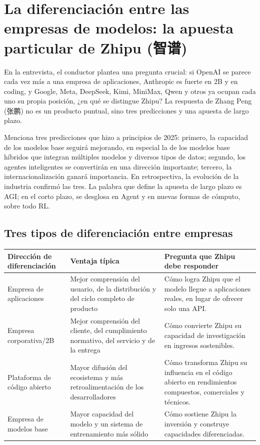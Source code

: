 \section{La diferenciación entre las empresas de modelos: la apuesta particular de Zhipu (智谱)}

En la entrevista, el conductor plantea una pregunta crucial: si OpenAI se parece cada vez más a una empresa de aplicaciones, Anthropic es fuerte en 2B y en coding, y Google, Meta, DeepSeek, Kimi, MiniMax, Qwen y otros ya ocupan cada uno su propia posición, ¿en qué se distingue Zhipu? La respuesta de Zhang Peng (张鹏) no es un producto puntual, sino tres predicciones y una apuesta de largo plazo.

Menciona tres predicciones que hizo a principios de 2025: primero, la capacidad de los modelos base seguirá mejorando, en especial la de los modelos base híbridos que integran múltiples modelos y diversos tipos de datos; segundo, los agentes inteligentes se convertirán en una dirección importante; tercero, la internacionalización ganará importancia. En retrospectiva, la evolución de la industria confirmó las tres. La palabra que define la apuesta de largo plazo es AGI; en el corto plazo, se desglosa en Agent y en nuevas formas de cómputo, sobre todo RL.

\subsection{Tres tipos de diferenciación entre empresas}

\begin{longtable}{p{}p{}p{}}
\toprule
Dirección de diferenciación & Ventaja típica & Pregunta que Zhipu debe responder \\
\midrule
Empresa de aplicaciones & Mejor comprensión del usuario, de la distribución y del ciclo completo de producto & Cómo logra Zhipu que el modelo llegue a aplicaciones reales, en lugar de ofrecer solo una API. \\
Empresa corporativa/2B & Mejor comprensión del cliente, del cumplimiento normativo, del servicio y de la entrega & Cómo convierte Zhipu su capacidad de investigación en ingresos sostenibles. \\
Plataforma de código abierto & Mayor difusión del ecosistema y más retroalimentación de los desarrolladores & Cómo transforma Zhipu su influencia en el código abierto en rendimientos compuestos, comerciales y técnicos. \\
Empresa de modelos base & Mayor capacidad del modelo y un sistema de entrenamiento más sólido & Cómo sostiene Zhipu la inversión y construye capacidades diferenciadas. \\
\bottomrule
\end{longtable}

